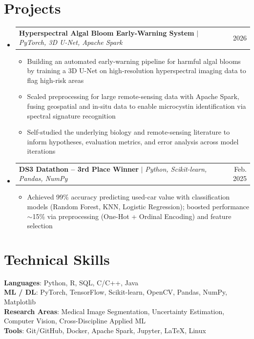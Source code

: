 \documentclass[letterpaper,10pt]{article}
\makeatletter
\newcommand{\resumeItem}[1]{
  \item\small{
    {#1 \vspace{-2pt}}
  }
}
\newcommand{\resumeProjectHeading}[2]{
    \item
    \begin{tabular*}{0.97\textwidth}{l@{\extracolsep{\fill}}r}
      \small#1 & #2 \\
    \end{tabular*}\vspace{-7pt}
}
\newcommand{\resumeSubHeadingListStart}{\begin{itemize}[leftmargin=0.15in, label={}]}
\newcommand{\resumeSubHeadingListEnd}{\end{itemize}}
\newcommand{\resumeItemListStart}{\begin{itemize}}
\newcommand{\resumeItemListEnd}{\end{itemize}\vspace{-5pt}}
\makeatother
\begin{document}
\section{Projects}
    \resumeSubHeadingListStart
      \resumeProjectHeading
          {\textbf{Hyperspectral Algal Bloom Early-Warning System} $|$ \emph{PyTorch, 3D U-Net, Apache Spark}}{2026}
          \resumeItemListStart
            \resumeItem{Building an automated early-warning pipeline for harmful algal blooms by training a 3D U-Net on high-resolution hyperspectral imaging data to flag high-risk areas}
            \resumeItem{Scaled preprocessing for large remote-sensing data with Apache Spark, fusing geospatial and in-situ data to enable microcystin identification via spectral signature recognition}
            \resumeItem{Self-studied the underlying biology and remote-sensing literature to inform hypotheses, evaluation metrics, and error analysis across model iterations}
          \resumeItemListEnd
      \resumeProjectHeading
          {\textbf{DS3 Datathon -- 3rd Place Winner} $|$ \emph{Python, Scikit-learn, Pandas, NumPy}}{Feb. 2025}
          \resumeItemListStart
            \resumeItem{Achieved 99\% accuracy predicting used-car value with classification models (Random Forest, KNN, Logistic Regression); boosted performance $\sim$15\% via preprocessing (One-Hot + Ordinal Encoding) and feature selection}
          \resumeItemListEnd
    \resumeSubHeadingListEnd


\section{Technical Skills}
 \begin{itemize}[leftmargin=0.15in, label={}]
    \small{\item{
     \textbf{Languages}{: Python, R, SQL, C/C++, Java} \\
     \textbf{ML / DL}{: PyTorch, TensorFlow, Scikit-learn, OpenCV, Pandas, NumPy, Matplotlib} \\
     \textbf{Research Areas}{: Medical Image Segmentation, Uncertainty Estimation, Computer Vision, Cross-Discipline Applied ML} \\
     \textbf{Tools}{: Git/GitHub, Docker, Apache Spark, Jupyter, LaTeX, Linux}
    }}
 \end{itemize}


\end{document}
